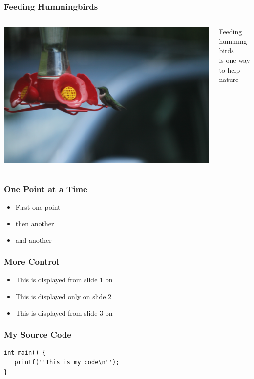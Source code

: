 \documentclass{beamer}
\begin{document}
\begin{frame}
   \frametitle{Feeding Hummingbirds}
     \begin{columns}[t] %
     \begin{column}[T]{5cm} %
   \includegraphics[width=\textwidth]{img_7991.jpg}
     \end{column}
     \begin{column}[T]{5cm} %
        Feeding hummingbirds \\ is one way to help nature
     \end{column}
     \end{columns}

\end{frame}

\begin{frame}
   \frametitle{One Point at a Time}
   \begin{itemize}
      \item First one point
      \pause \item then another
      \pause \item and another
   \end{itemize}
\end{frame}

\begin{frame}
   \frametitle{More Control}
   \begin{itemize}
      \item<1-> This is displayed from slide 1 on
      \item<2> This is displayed only on slide 2
      \item<3-> This is displayed from slide 3 on
   \end{itemize}
\end{frame}

\begin{frame}[fragile]
   \frametitle{My Source Code}
   \begin{lstlisting}
int main() {
   printf(''This is my code\n'');
}
   \end{lstlisting}
\end{frame}
\end{document}
